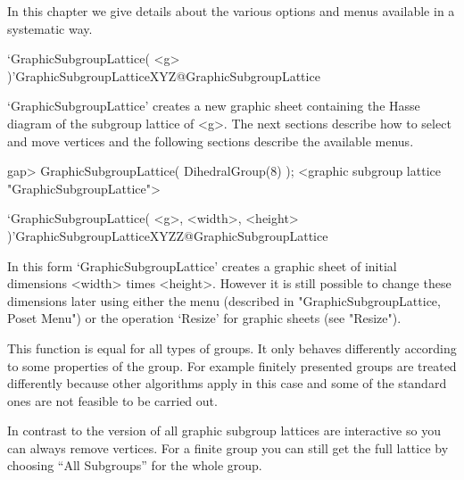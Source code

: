 
In this chapter we give details about the various options and menus
available in a systematic way.


\>`GraphicSubgroupLattice( <g> )'{GraphicSubgroupLatticeXYZ}@{GraphicSubgroupLattice}

`GraphicSubgroupLattice' creates a new graphic sheet containing the Hasse
diagram of the subgroup lattice of <g>.  The next sections describe
how to select and move vertices and the following sections describe the
available menus.

\begintt
gap> GraphicSubgroupLattice( DihedralGroup(8) );
<graphic subgroup lattice "GraphicSubgroupLattice">
\endtt

\>`GraphicSubgroupLattice( <g>, <width>, <height> )'{GraphicSubgroupLatticeXYZZ}@{GraphicSubgroupLattice}

In this form `GraphicSubgroupLattice' creates a graphic sheet of initial
dimensions <width> times <height>.  However it is still possible to change
these dimensions later using either the menu (described in
"GraphicSubgroupLattice, Poset Menu") or the operation `Resize' for graphic 
sheets (see "Resize").

This function is equal for all types of groups. It only behaves differently
according to some properties of the group. For example finitely presented
groups are treated differently because other algorithms apply in this case
and some of the standard ones are not feasible to be carried out. 

In contrast to the {} version of {\XGAP} all graphic subgroup lattices 
are interactive so you can always remove vertices. For a finite group you 
can still get the full lattice by choosing ``All Subgroups'' for the whole 
group.

%


